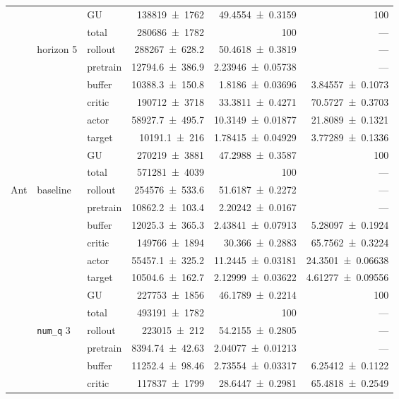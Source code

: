 {\begin{longtable}{@{}lllrrr@{}}
     &  & GU & \num{138819+-1762} & \num{49.4554+-0.3159} & 100 \\
     &  & total & \num{280686+-1782} & \num{100} & --- \\
    \addlinespace[2pt]
     & horizon 5 & rollout & \num{288267+-628.2} & \num{50.4618+-0.3819} & --- \\
     &  & pretrain & \num{12794.6+-386.9} & \num{2.23946+-0.05738} & --- \\
     &  & buffer & \num{10388.3+-150.8} & \num{1.8186+-0.03696} & \num{3.84557+-0.1073} \\
     &  & critic & \num{190712+-3718} & \num{33.3811+-0.4271} & \num{70.5727+-0.3703} \\
     &  & actor & \num{58927.7+-495.7} & \num{10.3149+-0.01877} & \num{21.8089+-0.1321} \\
     &  & target & \num{10191.1+-216} & \num{1.78415+-0.04929} & \num{3.77289+-0.1336} \\
     &  & GU & \num{270219+-3881} & \num{47.2988+-0.3587} & 100 \\
     &  & total & \num{571281+-4039} & \num{100} & --- \\
    \addlinespace[2pt]
    \midrule
    Ant & baseline & rollout & \num{254576+-533.6} & \num{51.6187+-0.2272} & --- \\
     &  & pretrain & \num{10862.2+-103.4} & \num{2.20242+-0.0167} & --- \\
     &  & buffer & \num{12025.3+-365.3} & \num{2.43841+-0.07913} & \num{5.28097+-0.1924} \\
     &  & critic & \num{149766+-1894} & \num{30.366+-0.2883} & \num{65.7562+-0.3224} \\
     &  & actor & \num{55457.1+-325.2} & \num{11.2445+-0.03181} & \num{24.3501+-0.06638} \\
     &  & target & \num{10504.6+-162.7} & \num{2.12999+-0.03622} & \num{4.61277+-0.09556} \\
     &  & GU & \num{227753+-1856} & \num{46.1789+-0.2214} & 100 \\
     &  & total & \num{493191+-1782} & \num{100} & --- \\
    \addlinespace[2pt]
     & \texttt{num\_q} 3 & rollout & \num{223015+-212} & \num{54.2155+-0.2805} & --- \\
     &  & pretrain & \num{8394.74+-42.63} & \num{2.04077+-0.01213} & --- \\
     &  & buffer & \num{11252.4+-98.46} & \num{2.73554+-0.03317} & \num{6.25412+-0.1122} \\
     &  & critic & \num{117837+-1799} & \num{28.6447+-0.2981} & \num{65.4818+-0.2549} \\

\end{longtable}}
